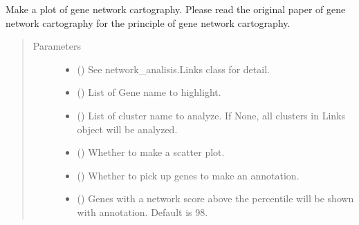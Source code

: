 \documentclass[letterpaper,10pt,english]{sphinxmanual}
\begin{document}
\begin{fulllineitems}
\begin{fulllineitems}
\label{\detokenize{modules/celloracle:celloracle.Links.plot_cartography_scatter_per_cluster}}
Make a plot of gene network cartography.
Please read the original paper of gene network cartography for the principle of gene network cartography.
\begin{quote}\begin{description}
\item[{Parameters}] \leavevmode\begin{itemize}
\item {} 
 ({\hyperref[\detokenize{modules/celloracle:celloracle.Links}]{}}) \textendash{} See network\_analisis.Links class for detail.

\item {} 
 () \textendash{} List of Gene name to highlight.

\item {} 
 () \textendash{} List of cluster name to analyze. If None, all clusters in Links object will be analyzed.

\item {} 
 () \textendash{} Whether to make a scatter plot.

\item {} 
 () \textendash{} Whether to pick up genes to make an annotation.

\item {} 
 () \textendash{} Genes with a network score above the percentile will be shown with annotation. Default is 98.


\end{itemize}
\end{description}
\end{quote}
\end{fulllineitems}
\end{fulllineitems}
\end{document}
